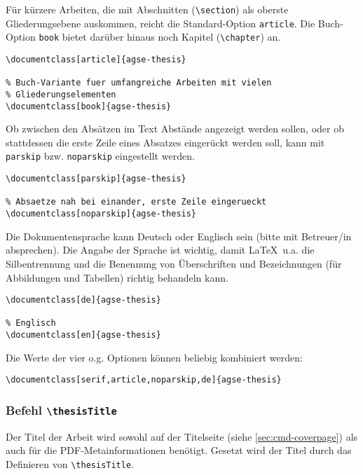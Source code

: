 Für kürzere Arbeiten, die mit Abschnitten (\texttt{\textbackslash{}section})
als oberste Gliederungsebene auskommen, reicht die Standard-Option
\texttt{article}.
Die Buch-Option \texttt{book} bietet darüber hinaus noch Kapitel
(\texttt{\textbackslash{}chapter}) an.
\begin{lstlisting}[language={[LaTeX]TeX}]
% Standard fuer kuerzere Arbeiten
\documentclass[article]{agse-thesis}

% Buch-Variante fuer umfangreiche Arbeiten mit vielen
% Gliederungselementen
\documentclass[book]{agse-thesis}
\end{lstlisting}

Ob zwischen den Absätzen im Text Abstände angezeigt werden sollen, oder ob
stattdessen die erste Zeile eines Absatzes eingerückt werden soll, kann mit
\texttt{parskip} bzw. \texttt{noparskip} eingestellt werden.
\begin{lstlisting}[language={[LaTeX]TeX}]
% Absaetze deutlich trennen
\documentclass[parskip]{agse-thesis}

% Absaetze nah bei einander, erste Zeile eingerueckt
\documentclass[noparskip]{agse-thesis}
\end{lstlisting}

Die Dokumentensprache kann Deutsch oder Englisch sein (bitte mit Betreuer/in
absprechen). Die Angabe der Sprache ist wichtig, damit \LaTeX\ u.a. die
Silbentrennung und die Benennung von Überschriften und Bezeichnungen
(für Abbildungen und Tabellen) richtig behandeln kann.
\begin{lstlisting}[language={[LaTeX]TeX}]
% Deutsch
\documentclass[de]{agse-thesis}

% Englisch
\documentclass[en]{agse-thesis}
\end{lstlisting}

Die Werte der vier o.g. Optionen können beliebig kombiniert werden:
\begin{lstlisting}[language={[LaTeX]TeX}]
% Einstellung des Beispieldokuments
\documentclass[serif,article,noparskip,de]{agse-thesis}
\end{lstlisting}

\subsubsection{Befehl \texttt{\textbackslash{}thesisTitle}}

Der Titel der Arbeit wird sowohl auf der Titelseite (siehe
\ref{sec:cmd-coverpage}) als auch für die PDF-Metainformationen benötigt.
Gesetzt wird der Titel durch das Definieren von
\texttt{\textbackslash{}thesisTitle}.


